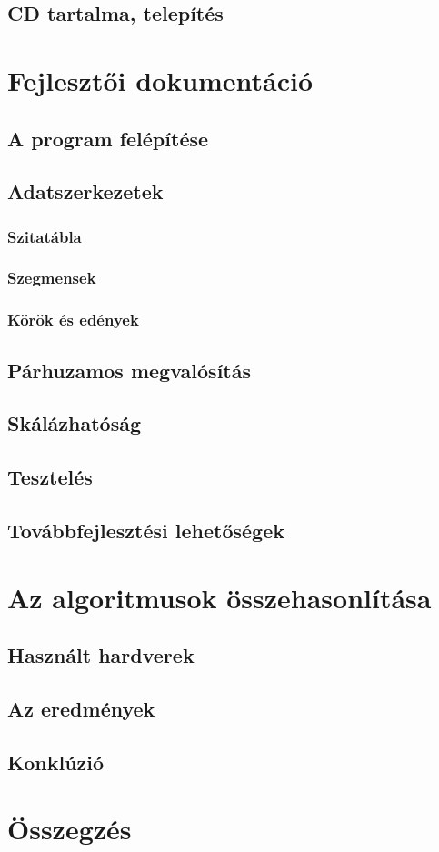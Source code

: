 \documentclass[twoside, a4paper, 12pt]{article}
\begin{document}
\subsection{CD tartalma, telepítés}

\clearpage
\section{Fejlesztői dokumentáció}

\subsection{A program felépítése}

\subsection{Adatszerkezetek}

\subsubsection{Szitatábla}
\subsubsection{Szegmensek}
\subsubsection{Körök és edények}

\subsection{Párhuzamos megvalósítás}

\subsection{Skálázhatóság}

\subsection{Tesztelés}

\subsection{Továbbfejlesztési lehetőségek}

\clearpage
\section{Az algoritmusok összehasonlítása}

\subsection{Használt hardverek}

\subsection{Az eredmények}

\subsection{Konklúzió}

\clearpage
\section{Összegzés}
\end{document}
